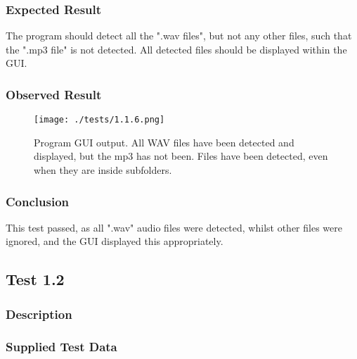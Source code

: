 \subsubsection*{Expected Result}
The program should detect all the ".wav files", but not any other files, such that the ".mp3 file" is not detected. All detected files should be displayed within the GUI.

\subsubsection*{Observed Result}
\label{sec:evidence1.1}
\begin{figure}[H]
	\texttt{[image: ./tests/1.1.6.png]}
	\caption{Program GUI output. All WAV files have been detected and displayed, but the mp3 has not been. Files have been detected, even when they are inside subfolders.}
\end{figure}

\subsubsection*{Conclusion}
This test passed, as all ".wav" audio files were detected, whilst other files were ignored, and the GUI displayed this appropriately.


\pagebreak
\subsection{Test 1.2}
\subsubsection*{Description}
\paragraph{}
{
	\centering
}

\subsubsection*{Supplied Test Data}
